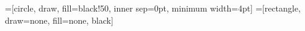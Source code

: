 =[circle, draw, fill=black!50,
                        inner sep=0pt, minimum width=4pt]
 =[rectangle, draw=none, fill=none, black]
